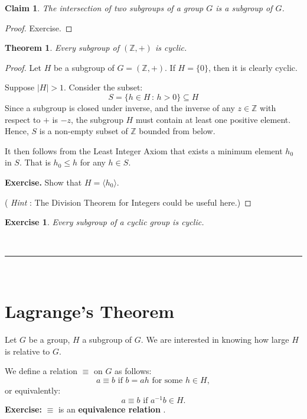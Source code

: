 \documentclass[a4paper,12pt]{report}
\newcommand{\abs}[1]{\left|#1\right|}
\newcounter{statement}
\numberwithin{statement}{chapter}
\newtheorem{thm}[statement]{Theorem}
\newtheorem{claim}[statement]{Claim}
\newtheorem{ex}[statement]{\bf Exercise}
\numberwithin{equation}{chapter}
\numberwithin{section}{chapter}
\numberwithin{subsection}{section}
\begin{document}
\begin{claim}
The intersection of two subgroups of a group $G$ is a subgroup of $G$.
\end{claim}
\begin{proof}
Exercise.
\end{proof}

\begin{thm}
Every subgroup of $(\mathbb{Z}, +)$ is cyclic.
\end{thm}
\begin{proof}

Let $H$ be a subgroup of $G = (\mathbb{Z}, +)$.
If $H = \{0\}$, then it is clearly cyclic.




Suppose $\abs{H} > 1$.  Consider the subset:
\[
S = \{h \in H \,:\, h > 0\} \subseteq H
\]
Since a subgroup is closed under inverse,
and the inverse of any $z \in \mathbb{Z}$
with respect to $+$ is $-z$, the subgroup $H$ must contain at least one positive
element.  Hence, $S$ is a non-empty subset of $\mathbb{Z}$ bounded from below.




It then follows from the Least Integer Axiom that exists a minimum element $h_0$ in $S$.
That is $h_0 \leq h$ for any $h \in S$.




 {\bf Exercise.}  Show that $H = \langle h_0 \rangle$.



( {\it Hint} : The Division Theorem for Integers could be useful here.)
\end{proof}
\begin{ex}
Every subgroup of a cyclic group is cyclic.
\end{ex}

\quad\\\hrule
\quad\\
\section*{Lagrange's Theorem}

Let $G$ be a group, $H$ a subgroup of $G$.
We are interested in knowing how large $H$ is relative to $G$.



We define a relation $\equiv$ on $G$ as follows:
\[
a \equiv b \text{ if } b = ah \text{ for some } h \in H,
\]
or equivalently:
\[
a \equiv b \text{ if } a^{-1}b \in H.
\]
 {\bf Exercise:}  $\equiv$ is an  {\bf equivalence relation} .
\end{document}

